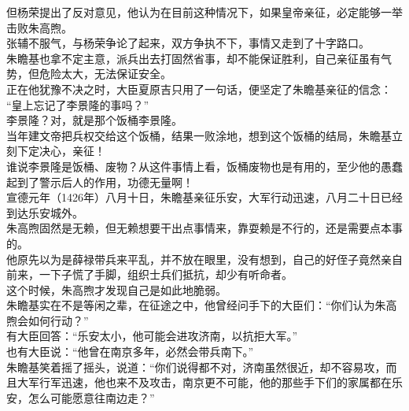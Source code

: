 \begin{multicols}{\theparacolNo}
但杨荣提出了反对意见，他认为在目前这种情况下，如果皇帝亲征，必定能够一举击败朱高煦。\\

张辅不服气，与杨荣争论了起来，双方争执不下，事情又走到了十字路口。\\

朱瞻基也拿不定主意，派兵出去打固然省事，却不能保证胜利，自己亲征虽有气势，但危险太大，无法保证安全。\\

正在他犹豫不决之时，大臣夏原吉只用了一句话，便坚定了朱瞻基亲征的信念：\\

“皇上忘记了李景隆的事吗？”\\

李景隆？对，就是那个饭桶李景隆。\\

当年建文帝把兵权交给这个饭桶，结果一败涂地，想到这个饭桶的结局，朱瞻基立刻下定决心，亲征！\\

谁说李景隆是饭桶、废物？从这件事情上看，饭桶废物也是有用的，至少他的愚蠢起到了警示后人的作用，功德无量啊！\\

宣德元年（1426年）八月十日，朱瞻基亲征乐安，大军行动迅速，八月二十日已经到达乐安城外。\\

朱高煦固然是无赖，但无赖想要干出点事情来，靠耍赖是不行的，还是需要点本事的。\\

他原先以为是薛禄带兵来平乱，并不放在眼里，没有想到，自己的好侄子竟然亲自前来，一下子慌了手脚，组织士兵们抵抗，却少有听命者。\\

这个时候，朱高煦才发现自己是如此地脆弱。\\

朱瞻基实在不是等闲之辈，在征途之中，他曾经问手下的大臣们：“你们认为朱高煦会如何行动？”\\

有大臣回答：“乐安太小，他可能会进攻济南，以抗拒大军。”\\

也有大臣说：“他曾在南京多年，必然会带兵南下。”\\

朱瞻基笑着摇了摇头，说道：“你们说得都不对，济南虽然很近，却不容易攻，而且大军行军迅速，他也来不及攻击，南京更不可能，他的那些手下们的家属都在乐安，怎么可能愿意往南边走？”\\


\end{multicols}
